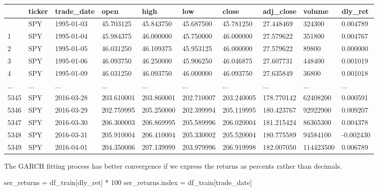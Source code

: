 \documentclass[
  letterpaper,
  DIV=11,
  numbers=noendperiod]{scrreprt}
\newenvironment{Shaded}{\begin{snugshade}}{\end{snugshade}}
\newcommand{\DecValTok}[1]{\textcolor[rgb]{0.68,0.00,0.00}{#1}}
\newcommand{\NormalTok}[1]{\textcolor[rgb]{0.00,0.23,0.31}{#1}}
\newcommand{\OperatorTok}[1]{\textcolor[rgb]{0.37,0.37,0.37}{#1}}
\newcommand{\StringTok}[1]{\textcolor[rgb]{0.13,0.47,0.30}{#1}}
\begin{document}
\begin{longtable}[]{@{}llllllllll@{}}
\toprule\noalign{}
& ticker & trade\_date & open & high & low & close & adj\_close & volume
& dly\_ret \\
\midrule\noalign{}
\endhead
\bottomrule\noalign{}
\endlastfoot
0 & SPY & 1995-01-03 & 45.703125 & 45.843750 & 45.687500 & 45.781250 &
27.448469 & 324300 & 0.004789 \\
1 & SPY & 1995-01-04 & 45.984375 & 46.000000 & 45.750000 & 46.000000 &
27.579622 & 351800 & 0.004767 \\
2 & SPY & 1995-01-05 & 46.031250 & 46.109375 & 45.953125 & 46.000000 &
27.579622 & 89800 & 0.000000 \\
3 & SPY & 1995-01-06 & 46.093750 & 46.250000 & 45.906250 & 46.046875 &
27.607731 & 448400 & 0.001019 \\
4 & SPY & 1995-01-09 & 46.031250 & 46.093750 & 46.000000 & 46.093750 &
27.635849 & 36800 & 0.001018 \\
... & ... & ... & ... & ... & ... & ... & ... & ... & ... \\
5345 & SPY & 2016-03-28 & 203.610001 & 203.860001 & 202.710007 &
203.240005 & 178.770142 & 62408200 & 0.000591 \\
5346 & SPY & 2016-03-29 & 202.759995 & 205.250000 & 202.399994 &
205.119995 & 180.423767 & 92922900 & 0.009207 \\
5347 & SPY & 2016-03-30 & 206.300003 & 206.869995 & 205.589996 &
206.020004 & 181.215424 & 86365300 & 0.004378 \\
5348 & SPY & 2016-03-31 & 205.910004 & 206.410004 & 205.330002 &
205.520004 & 180.775589 & 94584100 & -0.002430 \\
5349 & SPY & 2016-04-01 & 204.350006 & 207.139999 & 203.979996 &
206.919998 & 182.007050 & 114423500 & 0.006789 \\
\end{longtable}

The GARCH fitting process has better convergence if we express the
returns as percents rather than decimals.

\begin{Shaded}
\begin{Highlighting}[]
\NormalTok{ser\_returns }\OperatorTok{=}\NormalTok{ df\_train[}\StringTok{\textquotesingle{}dly\_ret\textquotesingle{}}\NormalTok{] }\OperatorTok{*} \DecValTok{100}
\NormalTok{ser\_returns.index }\OperatorTok{=}\NormalTok{ df\_train[}\StringTok{\textquotesingle{}trade\_date\textquotesingle{}}\NormalTok{]}
\end{Highlighting}
\end{Shaded}
\end{document}
